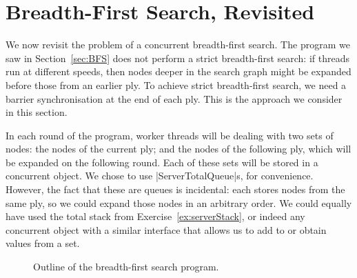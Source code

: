 \section{Breadth-First Search, Revisited}
\label{sec:sync-BFS}

We now revisit the problem of a concurrent breadth-first search.  The program
we saw in Section~\ref{sec:BFS} does not perform a strict breadth-first
search: if threads run at different speeds, then nodes deeper in the search
graph might be expanded before those from an earlier ply.  To achieve strict
breadth-first search, we need a barrier synchronisation at the end of each
ply.  This is the approach we consider in this section.

In each round of the program, worker threads will be dealing with two sets of
nodes: the nodes of the current ply; and the nodes of the following ply, which
will be expanded on the following round.  Each of these sets will be stored in
a concurrent object.  We chose to use |ServerTotalQueue|s, for convenience.
However, the fact that these are queues is incidental: each stores nodes from
the same ply, so we could expand those nodes in an arbitrary order.  We could
equally have used the total stack from Exercise~\ref{ex:serverStack}, or
indeed any concurrent object with a similar interface that allows us to add to
or obtain values from a set.


\begin{figure}
\caption{Outline of the breadth-first search program.}
\label{fig:sync-BFS}
\end{figure}

